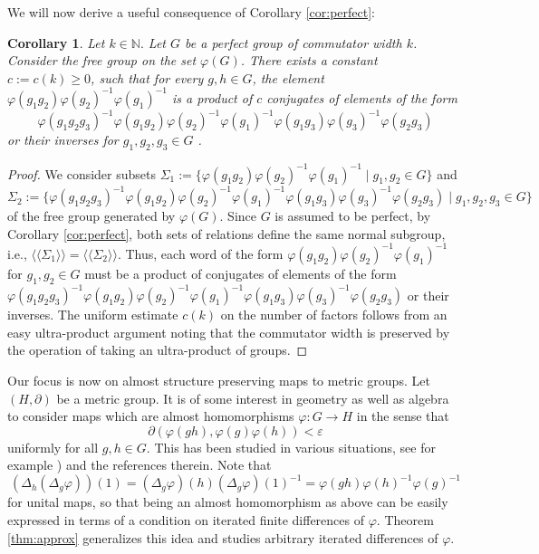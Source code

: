 \documentclass[a4paper,11pt]{amsproc}
\theoremstyle{plain}
\newtheorem{corollary}[theorem]{Corollary}
\theoremstyle{definition}
\begin{document}
We will now derive a useful consequence of Corollary \ref{cor:perfect}:

\begin{corollary} \label{cor:bound} Let $k \in \mathbb N.$
Let $G$ be a perfect group of commutator width $k$. Consider the free group on the set $\varphi(G)$. There exists a constant $c:=c(k)\geq 0$, such that for every $g,h \in G$, the element $\varphi(g_1g_2)\varphi(g_2)^{-1} \varphi(g_1)^{-1}$ is a product of $c$ conjugates of elements of the form
$$\varphi(g_1g_2g_3)^{-1} \varphi(g_1g_2)\varphi(g_2)^{-1}\varphi(g_1)^{-1} \varphi(g_1g_3)\varphi(g_3)^{-1}\varphi(g_2g_3)$$
or their inverses for $g_1,g_2,g_3 \in G$ .
\end{corollary}
\begin{proof} We consider subsets $\Sigma_1 := \{\varphi(g_1g_2)\varphi(g_2)^{-1} \varphi(g_1)^{-1} \mid g_1,g_2 \in G \}$ and $\Sigma_2 := \{\varphi(g_1g_2g_3)^{-1} \varphi(g_1g_2)\varphi(g_2)^{-1}\varphi(g_1)^{-1} \varphi(g_1g_3)\varphi(g_3)^{-1}\varphi(g_2g_3) \mid g_1,g_2,g_3 \in G\}$ of the free group generated by $\varphi(G)$.
Since $G$ is assumed to be perfect, by Corollary \ref{cor:perfect}, both sets of relations define the same normal subgroup, i.e., $\langle\! \langle \Sigma_1 \rangle\!\rangle = \langle\! \langle \Sigma_2 \rangle\!\rangle$. Thus, each word of the form $\varphi(g_1g_2)\varphi(g_2)^{-1} \varphi(g_1)^{-1}$ for $g_1,g_2 \in G$ must be a product of conjugates of elements of the form $\varphi(g_1g_2g_3)^{-1} \varphi(g_1g_2)\varphi(g_2)^{-1}\varphi(g_1)^{-1} \varphi(g_1g_3)\varphi(g_3)^{-1}\varphi(g_2g_3)$ or their inverses. The uniform estimate $c(k)$ on the number of factors follows from an easy ultra-product argument noting that the commutator width is preserved by the operation of taking an ultra-product of groups.
\end{proof}

Our focus is now on almost structure preserving maps to metric groups. Let $(H,\partial)$ be a metric group. It is of some interest in geometry as well as algebra to consider maps which are almost homomorphisms $\varphi \colon G \to H$ in the sense that
$$\partial(\varphi(gh),\varphi(g)\varphi(h))< \varepsilon$$ 
uniformly for all $g,h \in G$. This has been studied in various situations, see for example \cites{MR367862, MR693352, MR3733361, MR3867328, MR4634678}) and the references therein. Note that
$$(\Delta_{h}(\Delta_{g} \varphi))(1) = (\Delta_{g} \varphi)(h)(\Delta_{g} \varphi)(1)^{-1} = \varphi(gh) \varphi(h)^{-1} \varphi(g)^{-1}$$
for unital maps, so that being an almost homomorphism as above can be easily expressed in terms of a condition on iterated finite differences of $\varphi$. Theorem \ref{thm:approx} generalizes this idea and studies arbitrary iterated differences of $\varphi$. 
\end{document}
